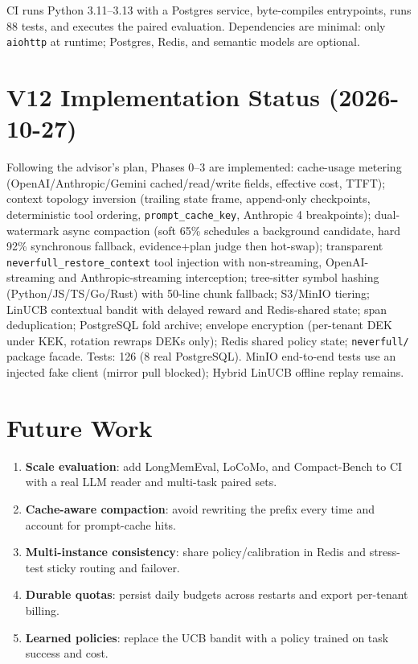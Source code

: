 \documentclass[11pt,a4paper]{article}
\begin{document}
CI runs Python 3.11--3.13 with a Postgres service, byte-compiles entrypoints, runs 88 tests, and executes the paired evaluation. Dependencies are minimal: only \texttt{aiohttp} at runtime; Postgres, Redis, and semantic models are optional.

\section{V12 Implementation Status (2026-10-27)}
Following the advisor's plan, Phases 0--3 are implemented: cache-usage metering (OpenAI/Anthropic/Gemini cached/read/write fields, effective cost, TTFT); context topology inversion (trailing state frame, append-only checkpoints, deterministic tool ordering, \texttt{prompt\_cache\_key}, Anthropic 4 breakpoints); dual-watermark async compaction (soft 65\% schedules a background candidate, hard 92\% synchronous fallback, evidence+plan judge then hot-swap); transparent \texttt{neverfull\_restore\_context} tool injection with non-streaming, OpenAI-streaming and Anthropic-streaming interception; tree-sitter symbol hashing (Python/JS/TS/Go/Rust) with 50-line chunk fallback; S3/MinIO tiering; LinUCB contextual bandit with delayed reward and Redis-shared state; span deduplication; PostgreSQL fold archive; envelope encryption (per-tenant DEK under KEK, rotation rewraps DEKs only); Redis shared policy state; \texttt{neverfull/} package facade. Tests: 126 (8 real PostgreSQL). MinIO end-to-end tests use an injected fake client (mirror pull blocked); Hybrid LinUCB offline replay remains.

\section{Future Work}
\begin{enumerate}
  \item \textbf{Scale evaluation}: add LongMemEval, LoCoMo, and Compact-Bench to CI with a real LLM reader and multi-task paired sets.
  \item \textbf{Cache-aware compaction}: avoid rewriting the prefix every time and account for prompt-cache hits.
  \item \textbf{Multi-instance consistency}: share policy/calibration in Redis and stress-test sticky routing and failover.
  \item \textbf{Durable quotas}: persist daily budgets across restarts and export per-tenant billing.
  \item \textbf{Learned policies}: replace the UCB bandit with a policy trained on task success and cost.
\end{enumerate}
\end{document}
